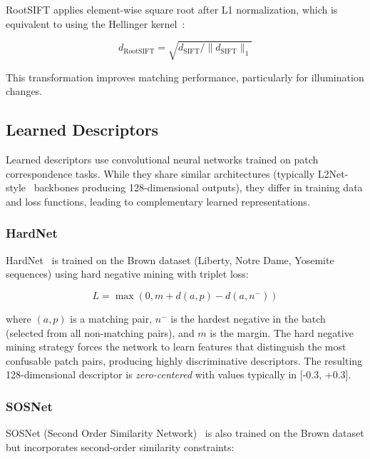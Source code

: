 RootSIFT applies element-wise square root after L1 normalization, which is equivalent to using the Hellinger kernel~\cite{arandjelovic2012three}:

\begin{equation}
    d_{\text{RootSIFT}} = \sqrt{d_{\text{SIFT}} / \|d_{\text{SIFT}}\|_1}
\end{equation}

This transformation improves matching performance, particularly for illumination changes.

\subsection{Learned Descriptors}

Learned descriptors use convolutional neural networks trained on patch correspondence tasks. While they share similar architectures (typically L2Net-style~\cite{tian2017l2net} backbones producing 128-dimensional outputs), they differ in training data and loss functions, leading to complementary learned representations.

\subsubsection{HardNet}

HardNet~\cite{mishchuk2017working} is trained on the Brown dataset (Liberty, Notre Dame, Yosemite sequences) using hard negative mining with triplet loss:

\begin{equation}
    L = \max(0, m + d(a, p) - d(a, n^-))
\end{equation}

where $(a, p)$ is a matching pair, $n^-$ is the hardest negative in the batch (selected from all non-matching pairs), and $m$ is the margin. The hard negative mining strategy forces the network to learn features that distinguish the most confusable patch pairs, producing highly discriminative descriptors. The resulting 128-dimensional descriptor is \textit{zero-centered} with values typically in [-0.3, +0.3].

\subsubsection{SOSNet}

SOSNet (Second Order Similarity Network)~\cite{tian2019sosnet} is also trained on the Brown dataset but incorporates second-order similarity constraints:

